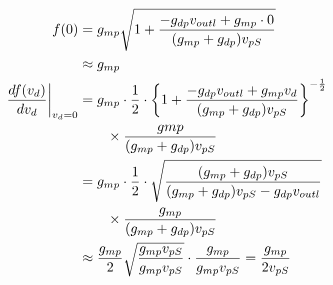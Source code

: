 \documentclass[twocolumn]{jsarticle}
\begin{document}
\begin{align}
    f(0)&=g_{mp}\sqrt{1+\frac{-g_{dp}v_{outl}+g_{mp}\cdot0}{(g_{mp}+g_{dp})v_{pS}}}\notag\\
    &\approx g_{mp} \notag \\
    \left.\frac{df(v_{d})}{dv_{d}}\right|_{v_{d}=0}&=g_{mp}\cdot\frac{1}{2}\cdot \left\{ 1+\frac{-g_{dp}v_{outl}+g_{mp}v_{d}}{(g_{mp}+g_{dp})v_{pS}} \right\} ^{-\frac{1}{2}}\notag\\
    &\qquad \times\frac{g{mp}}{(g_{mp}+g_{dp})v_{pS}}\notag\\
    &=g_{mp}\cdot\frac{1}{2}\cdot\sqrt{ \frac{(g_{mp}+g_{dp})v_{pS}}{ (g_{mp}+g_{dp})v_{pS}-g_{dp}v_{outl} } }\notag\\
    &\qquad \times\frac{g_{mp}}{(g_{mp}+g_{dp})v_{pS}}\notag\\
    &\approx\frac{g_{mp}}{2}\sqrt{ \frac{g_{mp}v_{pS}}{g_{mp}v_{pS}} }\cdot\frac{g_{mp}}{g_{mp}v_{pS}}=\frac{g_{mp}}{2v_{pS}} 
\end{align}
\end{document}
